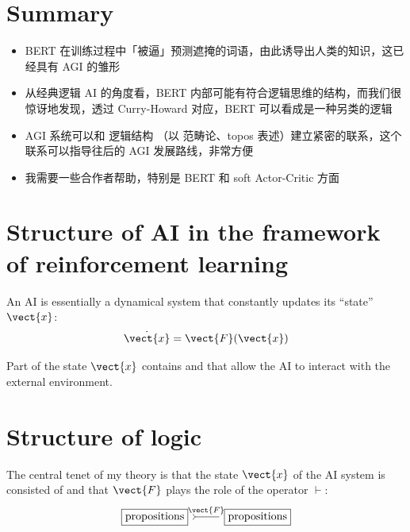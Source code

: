 \section*{Summary}
\begin{itemize}
	\item BERT 在训练过程中「被逼」预测遮掩的词语，由此诱导出人类的知识，这已经具有 AGI 的雏形
	
	\item 从经典逻辑 AI 的角度看，BERT 内部可能有符合逻辑思维的结构，而我们很惊讶地发现，透过 Curry-Howard 对应，BERT 可以看成是一种另类的逻辑
	
	\item AGI 系统可以和 逻辑结构 （以 范畴论、topos 表述）建立紧密的联系，这个联系可以指导往后的 AGI 发展路线，非常方便
	
	\item 我需要一些合作者帮助，特别是 BERT 和 soft Actor-Critic 方面
\end{itemize}

\tableofcontents


\section{Structure of AI in the framework of reinforcement learning}

An AI is essentially a dynamical system that constantly updates its ``state'' $\vect{x}$:
\begin{equation}
\dot{\vect{x}} = \vect{F}(\vect{x})
\end{equation}

Part of the state $\vect{x}$ contains  and  that allow the AI to interact with the external environment.



\section{Structure of logic}

The central tenet of my theory is that the state $\vect{x}$ of the AI system is consisted of  and that $\vect{F}$ plays the role of the  operator $\vdash$:
\begin{equation}
\begin{tikzcd}
\boxed{\mbox{propositions}}
\arrow[r, tail, no head, "\vect{F}"]
& \boxed{\mbox{propositions}}
\end{tikzcd}
\end{equation}

